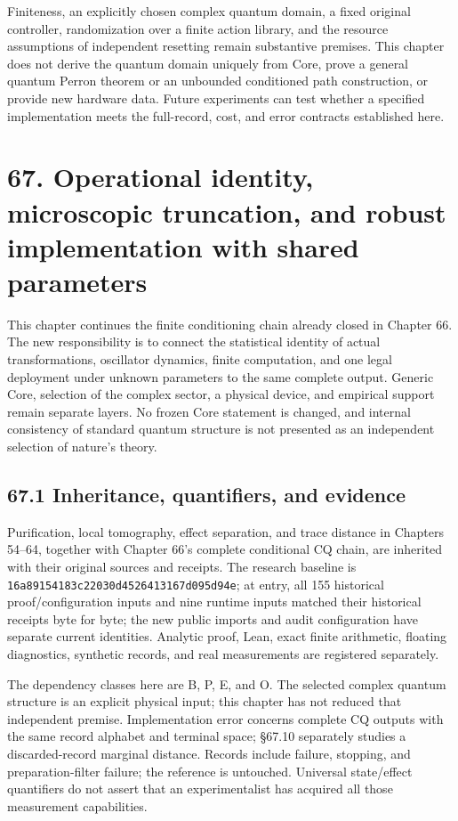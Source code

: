 \documentclass[
  11pt,
  oneside]{book}
\begin{document}
Finiteness, an explicitly chosen complex quantum domain, a fixed
original controller, randomization over a finite action library, and the
resource assumptions of independent resetting remain substantive
premises. This chapter does not derive the quantum domain uniquely from
Core, prove a general quantum Perron theorem or an unbounded conditioned
path construction, or provide new hardware data. Future experiments can
test whether a specified implementation meets the full-record, cost, and
error contracts established here.

\chapter{67. Operational identity, microscopic truncation, and robust
implementation with shared parameters}\label{ch-67}

This chapter continues the finite conditioning chain already closed in
Chapter 66. The new responsibility is to connect the statistical
identity of actual transformations, oscillator dynamics, finite
computation, and one legal deployment under unknown parameters to the
same complete output. Generic Core, selection of the complex sector, a
physical device, and empirical support remain separate layers. No frozen
Core statement is changed, and internal consistency of standard quantum
structure is not presented as an independent selection of nature's
theory.

\section{67.1 Inheritance, quantifiers, and evidence}

Purification, local tomography, effect separation, and trace distance in
Chapters 54--64, together with Chapter 66's complete conditional CQ
chain, are inherited with their original sources and receipts. The
research baseline is \texttt{16a89154183c\allowbreak 22030d452641\allowbreak 3167d095d94e};
at entry, all 155 historical proof/configuration inputs and nine runtime
inputs matched their historical receipts byte for byte; the new public
imports and audit configuration have separate current identities.
Analytic proof, Lean, exact finite arithmetic, floating diagnostics,
synthetic records, and real measurements are registered separately.

The dependency classes here are B, P, E, and O. The selected complex
quantum structure is an explicit physical input; this chapter has not
reduced that independent premise. Implementation error concerns complete
CQ outputs with the same record alphabet and terminal space; §67.10
separately studies a discarded-record marginal distance. Records include
failure, stopping, and preparation-filter failure; the reference is
untouched. Universal state/effect quantifiers do not assert that an
experimentalist has acquired all those measurement capabilities.
\end{document}
